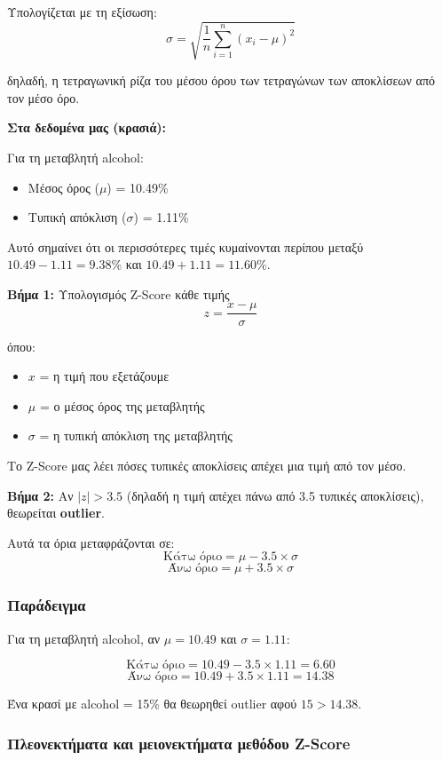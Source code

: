 \documentclass[12pt,a4paper]{article}
\begin{document}
Υπολογίζεται με τη εξίσωση:
$$\sigma = \sqrt{\frac{1}{n} \sum_{i=1}^{n} (x_i - \mu)^2}$$

δηλαδή, η τετραγωνική ρίζα του μέσου όρου των τετραγώνων των αποκλίσεων από τον μέσο όρο.

\textbf{Στα δεδομένα μας (κρασιά):}

Για τη μεταβλητή alcohol:
\begin{itemize}
    \item Μέσος όρος ($\mu$) = 10.49\%
    \item Τυπική απόκλιση ($\sigma$) = 1.11\%
\end{itemize}

Αυτό σημαίνει ότι οι περισσότερες τιμές κυμαίνονται περίπου μεταξύ $10.49 - 1.11 = 9.38$\% και $10.49 + 1.11 = 11.60$\%.

\textbf{Βήμα 1:} Υπολογισμός Z-Score κάθε τιμής
$$z = \frac{x - \mu}{\sigma}$$

όπου:
\begin{itemize}
    \item $x$ = η τιμή που εξετάζουμε
    \item $\mu$ = ο μέσος όρος της μεταβλητής
    \item $\sigma$ = η τυπική απόκλιση της μεταβλητής
\end{itemize}

Το Z-Score μας λέει πόσες τυπικές αποκλίσεις απέχει μια τιμή από τον μέσο.

\textbf{Βήμα 2:} Αν $|z| > 3.5$ (δηλαδή η τιμή απέχει πάνω από 3.5 τυπικές αποκλίσεις), θεωρείται \textbf{outlier}.

Αυτά τα όρια μεταφράζονται σε:
$$\text{Κάτω όριο} = \mu - 3.5 \times \sigma$$
$$\text{Άνω όριο} = \mu + 3.5 \times \sigma$$

\subsubsection{Παράδειγμα}

Για τη μεταβλητή alcohol, αν $\mu = 10.49$ και $\sigma = 1.11$:

$$\text{Κάτω όριο} = 10.49 - 3.5 \times 1.11 = 6.60$$
$$\text{Άνω όριο} = 10.49 + 3.5 \times 1.11 = 14.38$$

Ένα κρασί με alcohol = 15\% θα θεωρηθεί outlier αφού $15 > 14.38$.

\subsubsection{Πλεονεκτήματα και μειονεκτήματα μεθόδου Z-Score}
\end{document}
